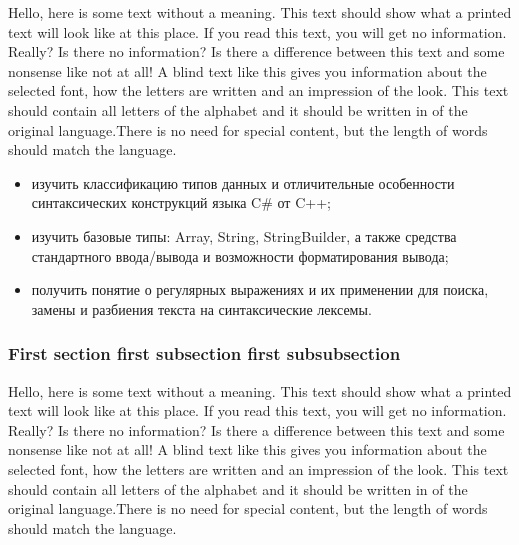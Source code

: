 \documentclass[a4paper,14pt]{extarticle}
\begin{document}
    Hello, here is some text without a meaning.  This text should show what 
    a printed text will look like at this place.  If you read this text, 
    you will get no information.  Really?  Is there no information?  Is there 
    a difference between this text and some nonsense like not at all!  A 
    blind text like this gives you information about the selected font, how 
    the letters are written and an impression of the look.  This text should
    contain all letters of the alphabet and it should be written in of the
    original language.There is no need for special content, but the length of
    words should match the language.

    \begin{itemize}
        
        \item изучить классификацию типов данных и отличительные 
              особенности синтаксических конструкций языка C\# от C++;

        \item изучить базовые типы: Array, String, StringBuilder, а также
              средства стандартного ввода/вывода и возможности форматирования
              вывода;

        \item получить понятие о регулярных выражениях и их применении для поиска,
              замены и разбиения текста на синтаксические лексемы.

    \end{itemize}

    \subsubsection{First section first subsection first subsubsection}

    Hello, here is some text without a meaning.  This text should show what 
    a printed text will look like at this place.  If you read this text, 
    you will get no information.  Really?  Is there no information?  Is there 
    a difference between this text and some nonsense like not at all!  A 
    blind text like this gives you information about the selected font, how 
    the letters are written and an impression of the look.  This text should
    contain all letters of the alphabet and it should be written in of the
    original language.There is no need for special content, but the length of
    words should match the language.
\end{document}
